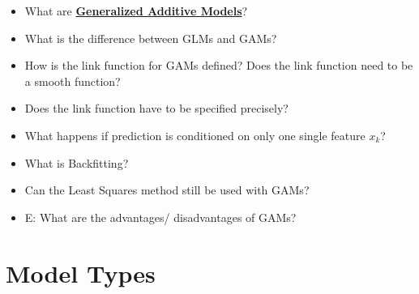 \documentclass{report}
\newcommand{\asw}[2][teal]{}
\renewcommand{\asw}[2][teal]{\textcolor{#1}{#2}}
\begin{document}
\begin{itemize}
	\item What are \textbf{\underline{Generalized Additive Models}}?
	\asw{\newline }
	\item What is the difference between GLMs and GAMs?
	\asw{\newline }
	\item How is the link function for GAMs defined? Does the link function need to be a smooth function?
	\asw{\newline }
	\item Does the link function have to be specified precisely?
	\asw{\newline }
	\item What happens if prediction is conditioned on only one single feature $x_k$?
	\asw{\newline }
	\item What is Backfitting?
	\asw{\newline }
	\item Can the Least Squares method still be used with GAMs?
	\asw{\newline }
	\item E: What are the advantages/ disadvantages of GAMs?
	\asw{\newline }
	
	\end{itemize}

	\section{Model Types}
	
\end{document}
